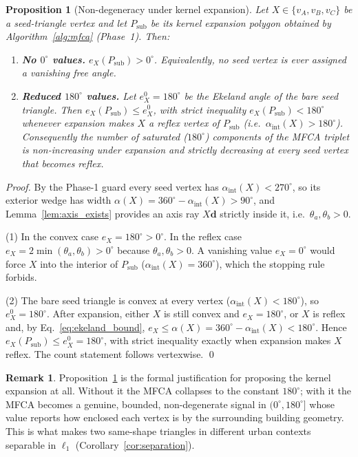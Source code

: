 \documentclass[10pt]{article}
\theoremstyle{plain}
\newtheorem{proposition}[theorem]{Proposition}
\theoremstyle{definition}
\newtheorem{remark}[theorem]{Remark}
\begin{document}
\begin{proposition}[Non-degeneracy under kernel expansion]
\label{prop:nondegen}
Let $X\in\{v_A,v_B,v_C\}$ be a seed-triangle vertex and let $P_{\mathrm{sub}}$
be its kernel expansion polygon obtained by Algorithm~\ref{alg:mfca} (Phase~1).
Then:
\begin{enumerate}[label=(\arabic*)]
  \item \textbf{No $0^\circ$ values.}
        $e_X(P_{\mathrm{sub}}) > 0^\circ$.
        Equivalently, no seed vertex is ever assigned a vanishing free angle.
  \item \textbf{Reduced $180^\circ$ values.}
        Let $e_X^{0}=180^\circ$ be the Ekeland angle of the bare seed triangle.
        Then $e_X(P_{\mathrm{sub}}) \le e_X^{0}$, with strict inequality
        $e_X(P_{\mathrm{sub}}) < 180^\circ$ whenever expansion makes $X$ a reflex
        vertex of $P_{\mathrm{sub}}$ (i.e.\ $\alpha_{\mathrm{int}}(X) > 180^\circ$).
        Consequently the number of saturated ($180^\circ$) components of the
        MFCA triplet is non-increasing under expansion and strictly decreasing
        at every seed vertex that becomes reflex.
\end{enumerate}
\end{proposition}
\begin{proof}
By the Phase-1 guard every seed vertex has $\alpha_{\mathrm{int}}(X)<270^\circ$,
so its exterior wedge has width $\alpha(X)=360^\circ-\alpha_{\mathrm{int}}(X)>90^\circ$,
and Lemma~\ref{lem:axis_exists} provides an axis ray $X\mathbf{d}$ strictly inside
it, i.e.\ $\theta_a,\theta_b>0$.

(1) In the convex case $e_X=180^\circ>0^\circ$. In the reflex case
$e_X=2\min(\theta_a,\theta_b)>0^\circ$ because $\theta_a,\theta_b>0$. A vanishing
value $e_X=0^\circ$ would force $X$ into the interior of $P_{\mathrm{sub}}$
($\alpha_{\mathrm{int}}(X)=360^\circ$), which the stopping rule forbids.

(2) The bare seed triangle is convex at every vertex
($\alpha_{\mathrm{int}}(X)<180^\circ$), so $e_X^{0}=180^\circ$. After expansion,
either $X$ is still convex and $e_X=180^\circ$, or $X$ is reflex and, by
Eq.~\eqref{eq:ekeland_bound},
$e_X\le\alpha(X)=360^\circ-\alpha_{\mathrm{int}}(X)<180^\circ$.
Hence $e_X(P_{\mathrm{sub}})\le e_X^{0}=180^\circ$, with strict inequality
exactly when expansion makes $X$ reflex. The count statement follows
vertexwise. \qed
\end{proof}

\begin{remark}
Proposition~\ref{prop:nondegen} is the formal justification for proposing the
kernel expansion at all.
Without it the MFCA collapses to the constant $180^\circ$; with it the MFCA
becomes a genuine, bounded, non-degenerate signal in $(0^\circ,180^\circ]$
whose value reports how enclosed each vertex is by the surrounding building
geometry.
This is what makes two same-shape triangles in different urban contexts
separable in $\ell_1$ (Corollary~\ref{cor:separation}).
\end{remark}
\end{document}
